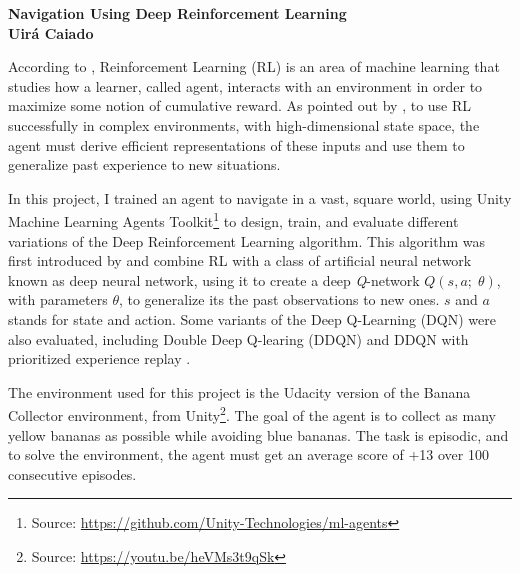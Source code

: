 \documentclass[a4paper]{article}
\begin{document}

\begin{center}

{\bf \large {Navigation Using Deep Reinforcement Learning \\ \small Uirá Caiado}}
\end{center}





According to \cite{spooner2016}, Reinforcement Learning (RL) is an area of machine learning that studies how a learner, called agent, interacts with an environment in order to maximize some notion of cumulative reward. As pointed out by \cite{mnih2015humanlevel}, to use RL successfully in complex environments, with high-dimensional state space, the agent must derive efficient representations of these inputs and use them to generalize past experience to new situations.

In this project, I trained an agent to navigate in a vast, square world, using Unity Machine Learning Agents Toolkit\footnote{Source: \url{https://github.com/Unity-Technologies/ml-agents}} to design, train, and evaluate different variations of the Deep Reinforcement Learning algorithm. This algorithm was first introduced by \cite{mnih2015humanlevel} and combine RL with a class of artificial neural network known as deep neural network, using it to create a
deep \textit{Q}-network $Q(s, a; \;\theta)$, with parameters $\theta$, to generalize its the past observations to new ones. $s$ and $a$ stands for state and action. Some variants of the Deep Q-Learning (DQN) were also evaluated, including Double Deep Q-learing (DDQN) \cite{HasseltGS15} and DDQN with prioritized experience replay \cite{SchaulQAS15}.

The environment used for this project is the Udacity version of the Banana Collector environment, from Unity\footnote{Source: \url{https://youtu.be/heVMs3t9qSk}}. The goal of the agent is to collect as many yellow bananas as possible while avoiding blue bananas. The task is episodic, and to solve the environment, the agent must get an average score of +13 over 100 consecutive episodes.
\end{document}
